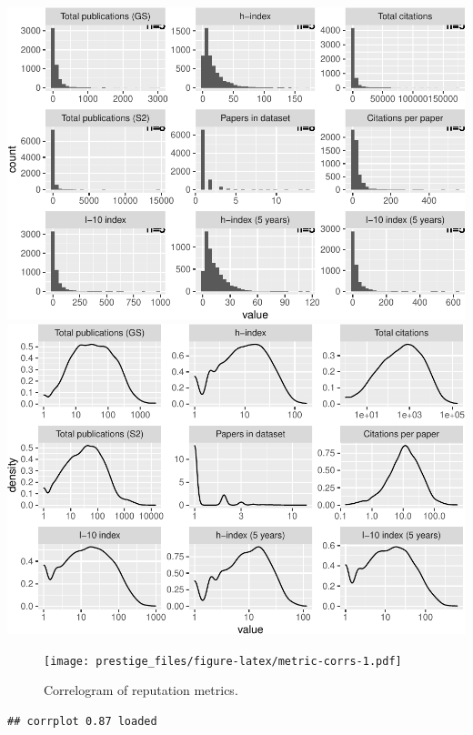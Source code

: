 \documentclass[12pt]{article}
\begin{document}
\includegraphics{prestige_files/figure-latex/metric-distribs-1.pdf} \includegraphics{prestige_files/figure-latex/metric-distribs-2.pdf}

\begin{figure}
\centering
\texttt{[image: prestige\_files/figure-latex/metric-corrs-1.pdf]}
\caption{\label{fig:metric-corrs-1}Correlogram of reputation metrics.}
\end{figure}

\begin{verbatim}
## corrplot 0.87 loaded
\end{verbatim}
\end{document}
